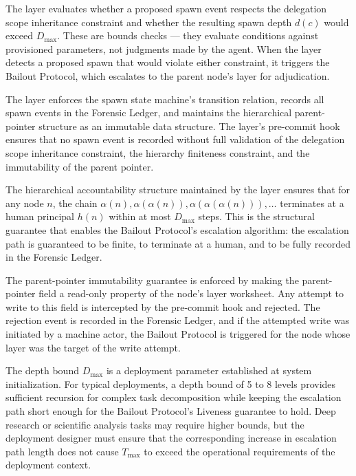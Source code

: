 The \bounds{} layer evaluates whether a proposed spawn event respects the delegation scope inheritance constraint and whether the resulting spawn depth $d(c)$ would exceed $D_{\max}$. These are bounds checks — they evaluate conditions against provisioned parameters, not judgments made by the agent. When the \bounds{} layer detects a proposed spawn that would violate either constraint, it triggers the Bailout Protocol, which escalates to the parent node's \purpose{} layer for adjudication.

The \fact{} layer enforces the spawn state machine's transition relation, records all spawn events in the Forensic Ledger, and maintains the hierarchical parent-pointer structure as an immutable data structure. The layer's pre-commit hook ensures that no spawn event is recorded without full validation of the delegation scope inheritance constraint, the hierarchy finiteness constraint, and the immutability of the parent pointer.

The hierarchical accountability structure maintained by the \fact{} layer ensures that for any node $n$, the chain $\alpha(n), \alpha(\alpha(n)), \alpha(\alpha(\alpha(n))), \ldots$ terminates at a human principal $h(n)$ within at most $D_{\max}$ steps. This is the structural guarantee that enables the Bailout Protocol's escalation algorithm: the escalation path is guaranteed to be finite, to terminate at a human, and to be fully recorded in the Forensic Ledger.

The parent-pointer immutability guarantee is enforced by making the parent-pointer field a read-only property of the node's \fact{} layer worksheet. Any attempt to write to this field is intercepted by the pre-commit hook and rejected. The rejection event is recorded in the Forensic Ledger, and if the attempted write was initiated by a machine actor, the Bailout Protocol is triggered for the node whose layer was the target of the write attempt.

The depth bound $D_{\max}$ is a deployment parameter established at system initialization. For typical deployments, a depth bound of 5 to 8 levels provides sufficient recursion for complex task decomposition while keeping the escalation path short enough for the Bailout Protocol's Liveness guarantee to hold. Deep research or scientific analysis tasks may require higher bounds, but the deployment designer must ensure that the corresponding increase in escalation path length does not cause $T_{\max}$ to exceed the operational requirements of the deployment context.

